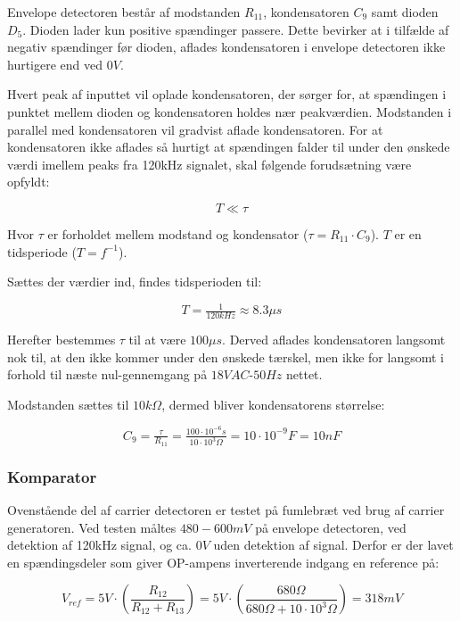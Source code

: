 Envelope detectoren består af modstanden $R_{11}$, kondensatoren $C_{9}$ samt dioden $D_{5}$. Dioden lader kun positive spændinger passere. Dette bevirker at i tilfælde af negativ spændinger før dioden, aflades kondensatoren i envelope detectoren ikke hurtigere end ved $0V$.

Hvert peak af inputtet vil oplade kondensatoren, der sørger for, at spændingen i punktet mellem dioden og kondensatoren holdes nær peakværdien. Modstanden i parallel med kondensatoren vil gradvist aflade kondensatoren. For at kondensatoren ikke aflades så hurtigt at spændingen falder til under den ønskede værdi imellem peaks fra 120kHz signalet, skal følgende forudsætning være opfyldt:

\begin{displaymath}
T \ll \tau
\end{displaymath}

Hvor $\tau$ er forholdet mellem modstand og kondensator ($\tau = R_{11} \cdot C_{9}$). $T$ er en tidsperiode ($T = f^{-1}$).

Sættes der værdier ind, findes tidsperioden til:

\begin{displaymath}
T = \tfrac{1}{120kHz} \approx 8.3 \mu s 
\end{displaymath}

Herefter bestemmes $\tau$ til at være $100 \mu s$. Derved aflades kondensatoren langsomt nok til, at den ikke kommer under den ønskede tærskel, men ikke for langsomt i forhold til næste nul-gennemgang på $18VAC$-$50Hz$ nettet.

Modstanden sættes til $10k\Omega$, dermed bliver kondensatorens størrelse:

\begin{displaymath}
C_{9} = \tfrac{\tau}{R_{11}} = \tfrac{100\cdot 10^{-6}s}{10 \cdot 10^{3}\Omega} = 10 \cdot 10^{-9}F = 10 nF
\end{displaymath}

\subsubsection{Komparator}
Ovenstående del af carrier detectoren er testet på fumlebræt ved brug af carrier generatoren. Ved testen måltes $480-600mV$ på envelope detectoren, ved detektion af 120kHz signal, og ca. $0V$ uden detektion af signal. Derfor er der lavet en spændingsdeler som giver OP-ampens\cite{lib:TS912} inverterende indgang en reference på:

\begin{displaymath}
V_{ref}= 5V \cdot \left(\dfrac{R_{12}}{R_{12}+R_{13}}\right)=5V \cdot \left(\dfrac{680\Omega}{680\Omega + 10 \cdot 10^{3}\Omega}\right)=318mV
\end{displaymath}

